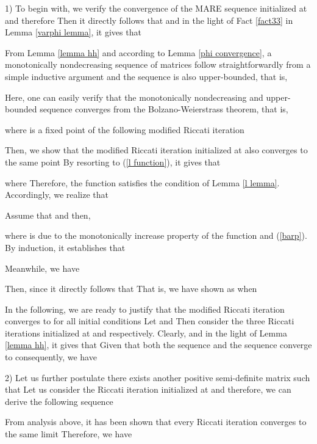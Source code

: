 \documentclass[journal]{IEEEtran}
\begin{document}
\begin{IEEEproof}1) To begin with, we verify the convergence of the MARE sequence initialized at  and therefore   Then it directly follows that  and in the light of Fact \ref{fact33} in Lemma \ref{varphi lemma}, it gives that

From Lemma \ref{lemma hh} and according to Lemma \ref{phi convergence}, a monotonically nondecreasing sequence of matrices follow straightforwardly from a simple inductive argument and the sequence is also upper-bounded, that is,

Here, one can easily verify that the monotonically nondecreasing and upper-bounded sequence converges from the Bolzano-Weierstrass theorem, that is,

where  is a fixed point of the following modified Riccati iteration


Then, we show that the modified Riccati iteration initialized at  also converges to the same point  By resorting to (\ref{l function}), it gives that

where  Therefore, the function  satisfies the condition of Lemma \ref{l lemma}. Accordingly, we realize that

Assume that  and then,

where is due to the monotonically increase property of the function  and (\ref{barp}). By induction, it establishes that

Meanwhile, we have

Then, since  it directly follows that 
That is, we have shown  as  when 

In the following, we are ready to justify that the modified Riccati iteration  converges to  for all initial conditions  Let  and  Then consider the three Riccati iterations initialized at  and  respectively. Clearly,  and in the light of Lemma \ref{lemma hh}, it gives that 
Given that both the sequence  and the sequence  converge to  consequently, we have 


2) Let us further postulate there exists another positive semi-definite matrix  such that  Let us consider the Riccati iteration initialized at  and therefore, we can derive the following sequence

From analysis above, it has been shown that every Riccati iteration converges to the same limit  Therefore, we have 
\end{IEEEproof}
\end{document}
